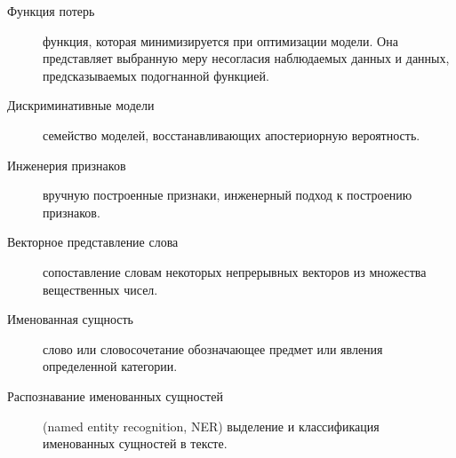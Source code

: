 \Defines
\begin{description}
\item[Функция потерь] функция, которая минимизируется при оптимизации модели. Она представляет выбранную меру несогласия наблюдаемых данных и данных, предсказываемых подогнанной функцией.
\item[Дискриминативные модели] семейство моделей, восстанавливающих апостериорную вероятность.
\item[Инженерия признаков] вручную построенные признаки, инженерный подход к построению признаков.
\item[Векторное представление слова] сопоставление словам некоторых непрерывных векторов из множества вещественных чисел.
\item [Именованная сущность] слово или словосочетание обозначающее предмет или явления определенной категории.
\item[Распознавание именованных сущностей] (named entity recognition, NER) выделение и классификация именованных сущностей в тексте.
\end{description}

